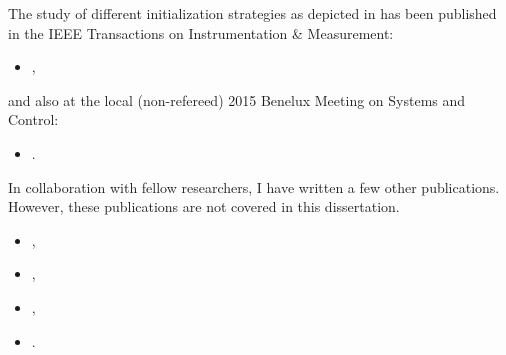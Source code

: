 \begin{refsection}
The study of different initialization strategies as depicted in  has been published in the \gls{IEEE} Transactions on Instrumentation \& Measurement:
\begin{itemize}
  \item {},
\end{itemize}
and also at the local (non-refereed) 2015 Benelux Meeting on Systems and Control:
\begin{itemize}
    \item {}.
\end{itemize}

In collaboration with fellow researchers, I have written a few other publications.
However, these publications are not covered in this dissertation.

\begin{itemize}
  \item {},
  \item {},
  \item {},
  \item {}.
\end{itemize}
\end{refsection}

